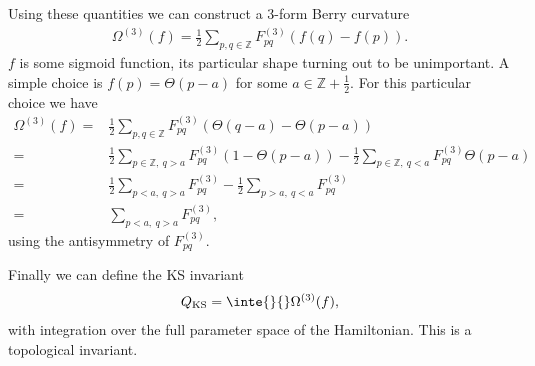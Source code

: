 Using these quantities we can construct a 3-form Berry curvature
\begin{align*}
	\Omega^{(3)}(f) = \frac{1}{2}\sum\limits_{p, q\in\mathbb{Z}}F^{(3)}_{pq}(f(q) - f(p)).
\end{align*}
$f$ is some sigmoid function, its particular shape turning out to be unimportant. A simple choice is $f(p) = \Theta(p - a)$ for some $a\in\mathbb{Z} + \frac{1}{2}$. For this particular choice we have
\begin{align*}
	\Omega^{(3)}(f) =& \frac{1}{2}\sum\limits_{p, q\in\mathbb{Z}}F^{(3)}_{pq}(\Theta(q - a) - \Theta(p - a)) \\
	                =& \frac{1}{2}\sum\limits_{p\in\mathbb{Z},\ q > a}F^{(3)}_{pq}(1 - \Theta(p - a)) - \frac{1}{2}\sum\limits_{p\in\mathbb{Z},\ q < a}F^{(3)}_{pq}\Theta(p - a) \\
	                =& \frac{1}{2}\sum\limits_{p < a,\ q > a}F^{(3)}_{pq} - \frac{1}{2}\sum\limits_{p > a,\ q < a}F^{(3)}_{pq} \\
	                =& \sum\limits_{p < a,\ q > a}F^{(3)}_{pq},
\end{align*}
using the antisymmetry of $F^{(3)}_{pq}$.

Finally we can define the KS invariant
\begin{align*}
	Q_{\text{KS}} = \inte{}{}\Omega^{(3)}(f),
\end{align*}
with integration over the full parameter space of the Hamiltonian. This is a topological invariant.

